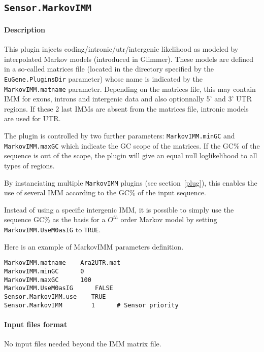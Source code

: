 
\subsection{\texttt{Sensor.MarkovIMM}}

\paragraph{Description}

This plugin injects coding/intronic/utr/intergenic likelihood as
modeled by interpolated Markov models (introduced in Glimmer). These
models are defined in a so-called matrices file (located in the
directory specified by the \texttt{EuGene.PluginsDir} parameter) whose
name is indicated by the \texttt{MarkovIMM.matname}
parameter. Depending on the matrices file, this may contain IMM for
exons, introns and intergenic data and also optionnally 5' and 3' UTR
regions. If these 2 last IMMs are absent from the matrices file,
intronic models are used for UTR.

The plugin is controlled by two further parameters:
\texttt{MarkovIMM.minGC} and \texttt{MarkovIMM.maxGC} which indicate
the GC scope of the matrices. If the GC\% of the sequence is out of
the scope, the plugin will give an equal null loglikelihood to all types
of regions.

By instanciating multiple \texttt{MarkovIMM} plugins (see
section~\ref{plug}), this enables the use of several IMM according to
the GC\% of the input sequence. 

Instead of using a specific intergenic IMM, it is possible to simply
use the sequence GC\% as the basis for a $O^{th}$ order Markov model
by setting \texttt{MarkovIMM.UseM0asIG} to \texttt{TRUE}.

Here is an example of MarkovIMM parameters definition.
\begin{Verbatim}[fontsize=\small]
MarkovIMM.matname    Ara2UTR.mat
MarkovIMM.minGC      0
MarkovIMM.maxGC      100
MarkovIMM.UseM0asIG      FALSE
Sensor.MarkovIMM.use    TRUE
Sensor.MarkovIMM        1      # Sensor priority
\end{Verbatim}

\paragraph{Input files format}

No input files  needed beyond the IMM matrix file. 

